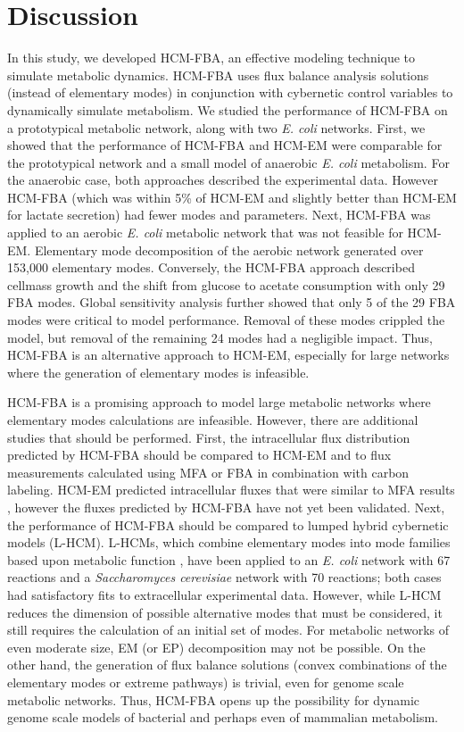 \documentclass[10pt,twocolumn,twoside,final]{IEEEtran}
\begin{document}
\section{Discussion}
In this study, we developed HCM-FBA, an effective modeling technique to simulate metabolic dynamics.
HCM-FBA uses flux balance analysis solutions (instead of elementary modes) in conjunction with cybernetic control variables to dynamically simulate metabolism.
We studied the performance of HCM-FBA on a prototypical metabolic network, along with two \emph{E. coli} networks.
First, we showed that the performance of HCM-FBA and HCM-EM were comparable for the prototypical network and a small model of anaerobic \textit{E. coli} metabolism.
For the anaerobic case, both approaches described the experimental data.
However HCM-FBA (which was within 5\% of HCM-EM and slightly better than HCM-EM for lactate secretion) had fewer modes and parameters.
Next, HCM-FBA was applied to an aerobic \textit{E. coli} metabolic network that was not feasible for HCM-EM.
Elementary mode decomposition of the aerobic network generated over 153,000 elementary modes.
Conversely, the HCM-FBA approach described cellmass growth and the shift from glucose to acetate consumption with only 29 FBA modes.
Global sensitivity analysis further showed that only 5 of the 29 FBA modes were critical to model performance.
Removal of these modes crippled the model, but removal of the remaining 24 modes had a negligible impact.
Thus, HCM-FBA is an alternative approach to HCM-EM, especially for large networks where the generation of elementary modes is infeasible.

HCM-FBA is a promising approach to model large metabolic networks where elementary modes calculations are infeasible.
However, there are additional studies that should be performed.
First, the intracellular flux distribution predicted by HCM-FBA should be compared to HCM-EM and to flux measurements calculated using MFA or FBA in combination with carbon labeling.
HCM-EM predicted intracellular fluxes that were similar to MFA results \cite{2008_kim_varner_ramkrishna_BiotechProg}, however the fluxes predicted by HCM-FBA have not yet been validated.
Next, the performance of HCM-FBA should be compared to lumped hybrid cybernetic models (L-HCM).
L-HCMs, which combine elementary modes into mode families based upon metabolic function \cite{2010_song,Song:2011aa},
have been applied to an \textit{E. coli} network with 67 reactions and a \textit{Saccharomyces cerevisiae} network with 70 reactions;
both cases had satisfactory fits to extracellular experimental data.
However, while L-HCM reduces the dimension of possible alternative modes that must be considered, it still requires the calculation of an initial set of modes.
For metabolic networks of even moderate size, EM (or EP) decomposition may not be possible.
On the other hand, the generation of flux balance solutions (convex combinations of the elementary modes or extreme pathways) is trivial, even for genome scale metabolic networks.
Thus, HCM-FBA opens up the possibility for dynamic genome scale models of bacterial and perhaps even of mammalian metabolism.
\end{document}
